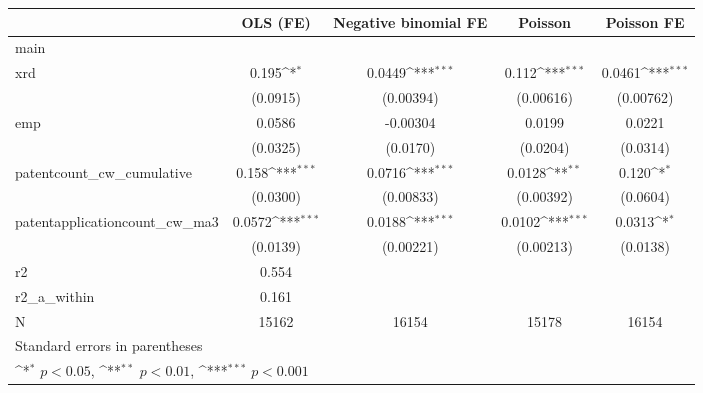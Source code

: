 {
\def\sym#1{\ifmmode^{#1}\else\(^{#1}\)\fi}
\begin{tabular}{l*{4}{c}}
\hline\hline
            &\multicolumn{1}{c}{OLS (FE)}&\multicolumn{1}{c}{Negative binomial FE}&\multicolumn{1}{c}{Poisson}&\multicolumn{1}{c}{Poisson FE}\\
\hline
main        &                     &                     &                     &                     \\
xrd         &       0.195\sym{*}  &      0.0449\sym{***}&       0.112\sym{***}&      0.0461\sym{***}\\
            &    (0.0915)         &   (0.00394)         &   (0.00616)         &   (0.00762)         \\
[1em]
emp         &      0.0586         &    -0.00304         &      0.0199         &      0.0221         \\
            &    (0.0325)         &    (0.0170)         &    (0.0204)         &    (0.0314)         \\
[1em]
patentcount\_cw\_cumulative&       0.158\sym{***}&      0.0716\sym{***}&      0.0128\sym{**} &       0.120\sym{*}  \\
            &    (0.0300)         &   (0.00833)         &   (0.00392)         &    (0.0604)         \\
[1em]
patentapplicationcount\_cw\_ma3&      0.0572\sym{***}&      0.0188\sym{***}&      0.0102\sym{***}&      0.0313\sym{*}  \\
            &    (0.0139)         &   (0.00221)         &   (0.00213)         &    (0.0138)         \\
\hline
r2          &       0.554         &                     &                     &                     \\
r2\_a\_within &       0.161         &                     &                     &                     \\
N           &       15162         &       16154         &       15178         &       16154         \\
\hline\hline
\multicolumn{5}{l}{\footnotesize Standard errors in parentheses}\\
\multicolumn{5}{l}{\footnotesize \sym{*} \(p<0.05\), \sym{**} \(p<0.01\), \sym{***} \(p<0.001\)}\\
\end{tabular}
}
